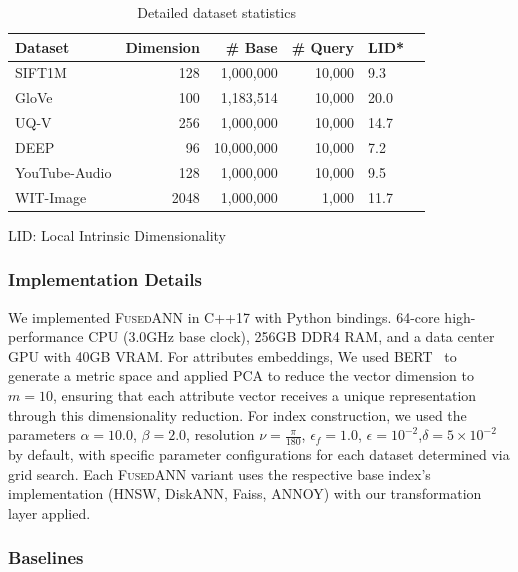 \documentclass[numbers,sort]{article}
\begin{document}
\begin{table}[ht]
\centering
\caption{Detailed dataset statistics}
\label{tab:datasets_supp}
\begin{threeparttable}
\begin{tabular}{lrrrll}
\toprule
Dataset & Dimension & \# Base & \# Query & LID*  \\
\midrule
SIFT1M & 128 & 1,000,000 & 10,000 & 9.3  \\
GloVe & 100 & 1,183,514 & 10,000 & 20.0 \\
UQ-V & 256 & 1,000,000 & 10,000 & 14.7  \\
DEEP & 96 & 10,000,000 & 10,000 & 7.2  \\
YouTube-Audio & 128 & 1,000,000 & 10,000 & 9.5 \\
WIT-Image & 2048 & 1,000,000 & 1,000 & 11.7 \\
\bottomrule
\end{tabular}
\begin{tablenotes}
\small
\item[*] LID: Local Intrinsic Dimensionality~\cite{fu2021high}
\end{tablenotes}
\end{threeparttable}
\end{table}

\subsubsection{Implementation Details}

We implemented \textsc{FusedANN} in C++17 with Python bindings. 64-core high-performance CPU (3.0GHz base clock), 256GB DDR4 RAM, and a data center GPU with 40GB VRAM. For attributes embeddings, We used BERT~\cite{devlin2019bert} to generate a metric space and applied PCA to reduce the vector dimension to $m=10$, ensuring that each attribute vector receives a unique representation through this dimensionality reduction. For index construction, we used the parameters $\alpha = 10.0$, $\beta = 2.0$, resolution $\nu=\frac{\pi}{180}$,  $\epsilon_f=1.0$, $\epsilon=10^{-2}$,$\delta=5\times 10^{-2}$ by default, with specific parameter configurations for each dataset determined via grid search. Each \textsc{FusedANN} variant uses the respective base index's implementation (HNSW, DiskANN, Faiss, ANNOY) with our transformation layer applied.

\subsubsection{Baselines}
\end{document}
